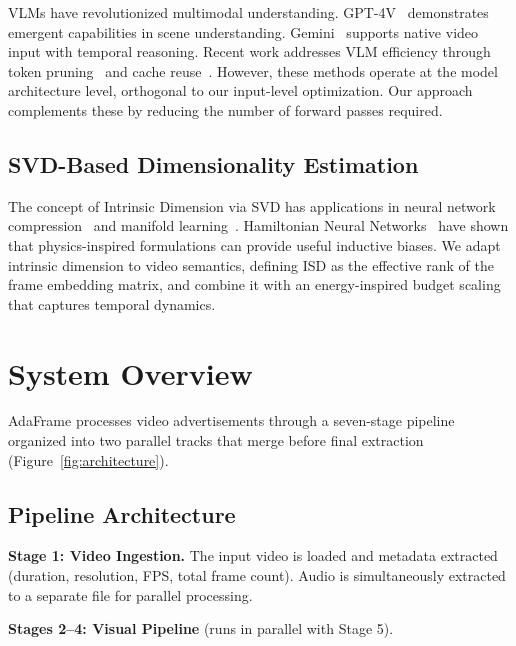 \documentclass[sigconf,nonacm]{acmart}
\begin{document}
VLMs have revolutionized multimodal understanding. GPT-4V~\cite{openai2023gpt4v} demonstrates emergent capabilities in scene understanding. Gemini~\cite{team2023gemini} supports native video input with temporal reasoning. Recent work addresses VLM efficiency through token pruning~\cite{chen2024tokenpacker} and cache reuse~\cite{kwon2023efficient}. However, these methods operate at the model architecture level, orthogonal to our input-level optimization. Our approach complements these by reducing the number of forward passes required.

\subsection{SVD-Based Dimensionality Estimation}

The concept of Intrinsic Dimension via SVD has applications in neural network compression~\cite{denton2014exploiting} and manifold learning~\cite{fefferman2016testing}. Hamiltonian Neural Networks~\cite{greydanus2019hamiltonian} have shown that physics-inspired formulations can provide useful inductive biases. We adapt intrinsic dimension to video semantics, defining ISD as the effective rank of the frame embedding matrix, and combine it with an energy-inspired budget scaling that captures temporal dynamics.

\section{System Overview}
\label{sec:system_overview}

AdaFrame processes video advertisements through a seven-stage pipeline organized into two parallel tracks that merge before final extraction (Figure~\ref{fig:architecture}).

\subsection{Pipeline Architecture}

\textbf{Stage 1: Video Ingestion.} The input video is loaded and metadata extracted (duration, resolution, FPS, total frame count). Audio is simultaneously extracted to a separate file for parallel processing.

\textbf{Stages 2--4: Visual Pipeline} (runs in parallel with Stage 5).
\end{document}
